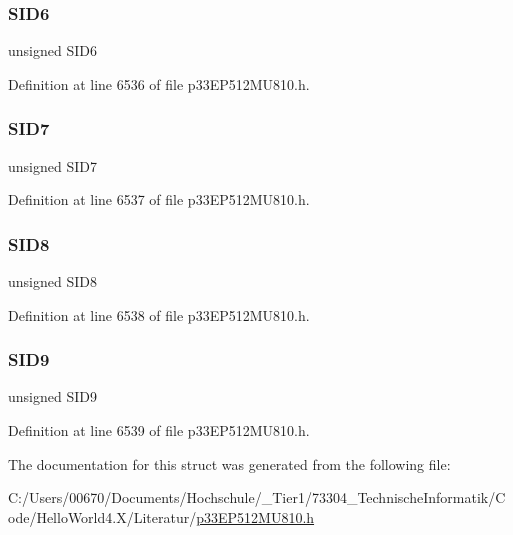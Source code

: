 \subsubsection{\texorpdfstring{S\+I\+D6}{SID6}}
{\footnotesize\ttfamily unsigned S\+I\+D6}



Definition at line 6536 of file p33\+E\+P512\+M\+U810.\+h.

\mbox{\label{structtag_c2_r_x_f6_s_i_d_b_i_t_s_a34097fb76decd431701fa2d86a22328e}} 
\subsubsection{\texorpdfstring{S\+I\+D7}{SID7}}
{\footnotesize\ttfamily unsigned S\+I\+D7}



Definition at line 6537 of file p33\+E\+P512\+M\+U810.\+h.

\mbox{\label{structtag_c2_r_x_f6_s_i_d_b_i_t_s_afe74894633244fdb0b0c01b4e8c522e7}} 
\subsubsection{\texorpdfstring{S\+I\+D8}{SID8}}
{\footnotesize\ttfamily unsigned S\+I\+D8}



Definition at line 6538 of file p33\+E\+P512\+M\+U810.\+h.

\mbox{\label{structtag_c2_r_x_f6_s_i_d_b_i_t_s_a33587704948067005c2a6a3ccc503c99}} 
\subsubsection{\texorpdfstring{S\+I\+D9}{SID9}}
{\footnotesize\ttfamily unsigned S\+I\+D9}



Definition at line 6539 of file p33\+E\+P512\+M\+U810.\+h.



The documentation for this struct was generated from the following file\+:\begin{DoxyCompactItemize}
\item 
C\+:/\+Users/00670/\+Documents/\+Hochschule/\+\_\+\+Tier1/73304\+\_\+\+Technische\+Informatik/\+Code/\+Hello\+World4.\+X/\+Literatur/\hyperlink{p33_e_p512_m_u810_8h}{p33\+E\+P512\+M\+U810.\+h}\end{DoxyCompactItemize}
